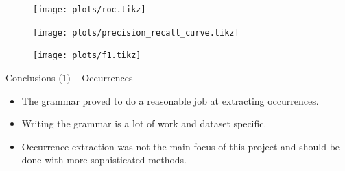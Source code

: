 \documentclass[12pt]{beamer}
\theoremstyle{break}
\begin{document}


\begin{frame}[plain]
	\begin{figure}
    \centering
	    \texttt{[image: plots/roc.tikz]}
	\end{figure}

\end{frame}




\begin{frame}[plain]
	\begin{figure}
    \centering
    \texttt{[image: plots/precision\_recall\_curve.tikz]}
	\end{figure}

\end{frame}




\begin{frame}[plain]
	\begin{figure}
	    \centering
	    \texttt{[image: plots/f1.tikz]}
	\end{figure}
\end{frame}




\begin{frame}{Conclusions (1) -- Occurrences}

	\begin{itemize}
		\item The grammar proved to do a reasonable job at extracting occurrences.
		\item Writing the grammar is a lot of work and dataset specific.
		\item Occurrence extraction was not the main focus of this project and should be done with more sophisticated methods.
	\end{itemize}

\end{frame}


\end{document}

